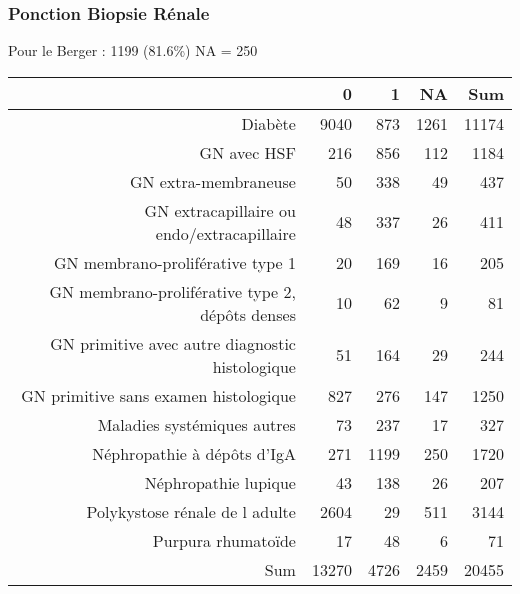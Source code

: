 \documentclass[11pt,a4paper]{article}\usepackage[]{graphicx}\usepackage[]{color}
\begin{document}
      \subsubsection{Ponction Biopsie Rénale}

Pour le Berger : 1199 (81.6\%) NA = 250

\begin{table}[H]
\centering
\begin{tabular}{rrrrr}
  \hline
 & 0 & 1 & NA & Sum \\ 
  \hline
Diabète & 9040 & 873 & 1261 & 11174 \\ 
  GN avec HSF & 216 & 856 & 112 & 1184 \\ 
  GN extra-membraneuse & 50 & 338 & 49 & 437 \\ 
  GN extracapillaire ou endo/extracapillaire & 48 & 337 & 26 & 411 \\ 
  GN membrano-proliférative type 1 & 20 & 169 & 16 & 205 \\ 
  GN membrano-proliférative type 2, dépôts denses & 10 & 62 & 9 & 81 \\ 
  GN primitive avec autre diagnostic histologique & 51 & 164 & 29 & 244 \\ 
  GN primitive sans examen histologique & 827 & 276 & 147 & 1250 \\ 
  Maladies systémiques autres & 73 & 237 & 17 & 327 \\ 
  Néphropathie à dépôts d'IgA & 271 & 1199 & 250 & 1720 \\ 
  Néphropathie lupique & 43 & 138 & 26 & 207 \\ 
  Polykystose rénale de l adulte & 2604 & 29 & 511 & 3144 \\ 
  Purpura rhumatoïde & 17 & 48 & 6 & 71 \\ 
  Sum & 13270 & 4726 & 2459 & 20455 \\ 
   \hline
\end{tabular}
\end{table}
\end{document}
